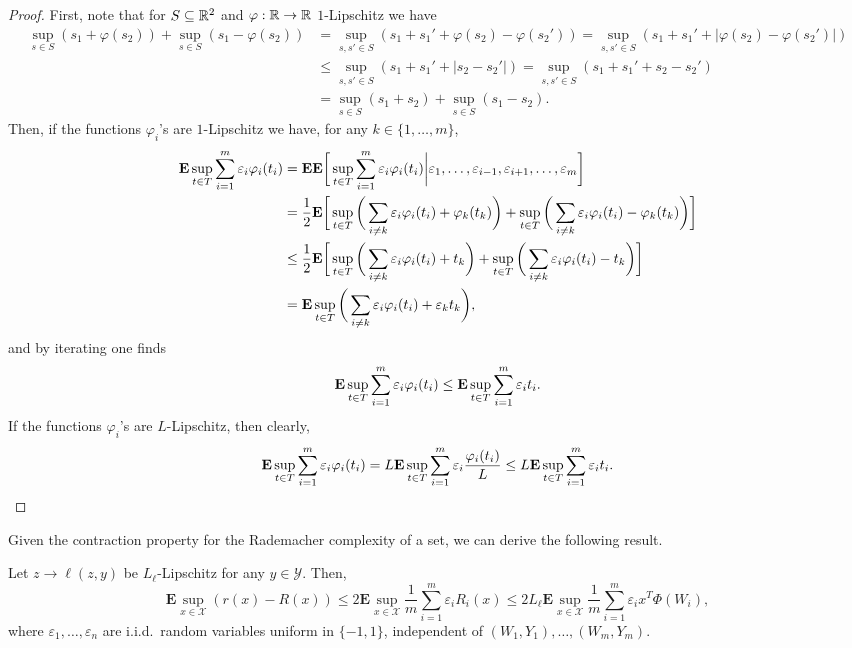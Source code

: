 \begin{proof}
First, note that for $S\subseteq\mathbb{R}^2$ and $\varphi:\mathbb{R}\rightarrow\mathbb{R}$ $1$-Lipschitz we have
\begin{align*}
	\sup_{s\in S} (s_1+\varphi(s_2)) + \sup_{s\in S} (s_1-\varphi(s_2))
	&= \sup_{s,s'\in S} (s_1+s_1'+\varphi(s_2)-\varphi(s_2'))
	= \sup_{s,s'\in S} (s_1+s_1'+|\varphi(s_2)-\varphi(s_2')|)\\
	&\le \sup_{s,s'\in S} (s_1+s_1'+|s_2-s_2'|)
	= \sup_{s,s'\in S} (s_1+s_1'+s_2-s_2')\\
	&= \sup_{s\in S} (s_1+s_2) + \sup_{s\in S} (s_1-s_2).
\end{align*}
Then, if the functions $\varphi_i$'s are $1$-Lipschitz we have, for any $k\in\{1,\ldots,m\}$,
\begin{align*}
	\E\sup_{t\in T}\sum_{i=1}^m \varepsilon_i \varphi_i(t_i)
	&=
	\E\E\bigg[\sup_{t\in T}\sum_{i=1}^m \varepsilon_i \varphi_i(t_i)\bigg| \varepsilon_1,\ldots,\varepsilon_{i-1},\varepsilon_{i+1},\ldots,\varepsilon_{m}\bigg]\\
	&=
	\frac{1}{2}
	\E 
	\bigg[
	\sup_{t\in T}
	\bigg(
	\sum_{i\neq k} \varepsilon_i \varphi_i(t_i)
	+ \varphi_k(t_k) 
	\bigg)
	+ 
	\sup_{t\in T}
	\bigg(\sum_{i\neq k} \varepsilon_i \varphi_i(t_i)
	- \varphi_k(t_k)
	\bigg)
	\bigg]\\
	&\le
	\frac{1}{2}
	\E 
	\bigg[
	\sup_{t\in T}
	\bigg(
	\sum_{i\neq k} \varepsilon_i \varphi_i(t_i)
	+ t_k
	\bigg)
	+ 
	\sup_{t\in T}
	\bigg(\sum_{i\neq k} \varepsilon_i \varphi_i(t_i)
	- t_k
	\bigg)
	\bigg]\\
	&=
	\E 
	\sup_{t\in T}
	\bigg(
	\sum_{i\neq k} \varepsilon_i \varphi_i(t_i)
	+ \varepsilon_k t_k
	\bigg),
\end{align*}
and by iterating one finds
$$
	\E\sup_{t\in T}\sum_{i=1}^m \varepsilon_i \varphi_i(t_i)
	\le
	\E\sup_{t\in T}\sum_{i=1}^m \varepsilon_i t_i. 
$$
If the functions $\varphi_i$'s are $L$-Lipschitz, then clearly,
$$
	\E\sup_{t\in T}\sum_{i=1}^m \varepsilon_i \varphi_i(t_i)
	=
	L
	\E\sup_{t\in T}\sum_{i=1}^m \varepsilon_i \frac{\varphi_i(t_i)}{L}
	\le
	L \E\sup_{t\in T}\sum_{i=1}^m \varepsilon_i t_i. 
$$
\end{proof}

Given the contraction property for the Rademacher complexity of a set, we can derive the following result.
\begin{proposition}
\label{prop:radamacher}
Let $z\rightarrow \ell(z,y)$ be $L_\ell$-Lipschitz for any $y\in\mathcal{Y}$. Then,
$$
	\mathbf{E}\sup_{x\in\mathcal{X}} ( r(x) - R(x) )
	\le 2\mathbf{E}\sup_{x\in\mathcal{X}} \frac{1}{m}\sum_{i=1}^m \varepsilon_i R_i(x)
	\le
	2L_\ell\mathbf{E} \sup_{x\in\mathcal{X}} \frac{1}{m}\sum_{i=1}^m\varepsilon_i x^T\Phi(W_i),
$$
where $\varepsilon_1,\ldots,\varepsilon_n$ are i.i.d.\ random variables uniform in $\{-1,1\}$, independent of $(W_1,Y_1),\ldots,(W_m,Y_m)$. 
\end{proposition}


